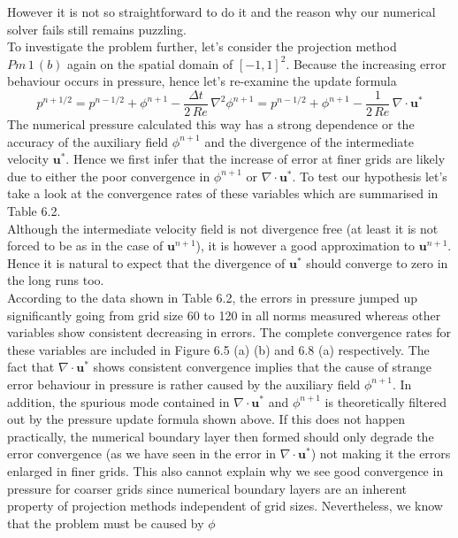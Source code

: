 However it is not so straightforward to do it and the reason why our numerical solver fails still remains puzzling.\\

To investigate the problem further, let's consider the projection method $Pm\,1\,(b)$ again on the spatial domain of $[-1,1]^2$. Because the increasing error behaviour occurs in pressure, hence let's re-examine the update formula
\begin{equation*}
p^{n+1/2} = p^{n-1/2} + \phi^{n+1} - \dfrac{\Delta t}{2\,Re}\,\nabla^2 \phi^{n+1} = p^{n-1/2} + \phi^{n+1} - \dfrac{1}{2\,Re}\,\nabla \cdot \textbf{u}^*
\end{equation*}
The numerical pressure calculated this way has a strong dependence or the accuracy of the auxiliary field $\phi^{n+1}$ and the divergence of the intermediate velocity $\textbf{u}^*$. Hence we first infer that the increase of error at finer grids are likely due to either the poor convergence in $\phi^{n+1}$ or $\nabla \cdot \textbf{u}^*$. To test our hypothesis let's take a look at the convergence rates of these variables which are summarised in Table 6.2. \\
Although the intermediate velocity field is not divergence free (at least it is not forced to be as in the case of $\textbf{u}^{n+1}$), it is however a good approximation to $\textbf{u}^{n+1}$. Hence it is natural to expect that the divergence of $\textbf{u}^*$ should converge to zero in the long runs too.\\

According to the data shown in Table 6.2, the errors in pressure jumped up significantly going from grid size 60 to 120 in all norms measured whereas other variables show consistent decreasing in errors. The complete convergence rates for these variables are included in Figure 6.5 (a) (b) and 6.8 (a) respectively. The fact that $\nabla \cdot \textbf{u}^*$ shows consistent convergence implies that the cause of strange error behaviour in pressure is rather caused by the auxiliary field $\phi^{n+1}$. In addition, the spurious mode contained in $\nabla \cdot \textbf{u}^*$ and $\phi^{n+1}$ is theoretically filtered out by the pressure update formula shown above. If this does not happen practically, the numerical boundary layer then formed should only degrade the error convergence (as we have seen in the error in $\nabla \cdot \textbf{u}^*$) not making it the errors enlarged in finer grids. This also cannot explain why we see good convergence in pressure for coarser grids since numerical boundary layers are an inherent property of projection methods independent of grid sizes. Nevertheless, we know that the problem must be caused by $\phi$\\

